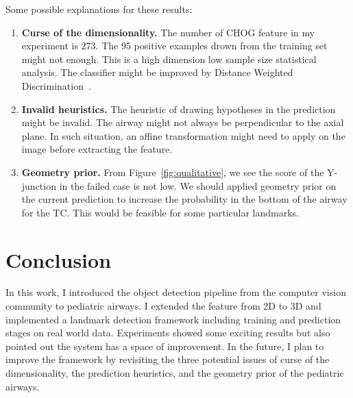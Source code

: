 \documentclass{article}
\begin{document}
Some possible explanations for these results:
\begin{enumerate}
\item {\bf Curse of the dimensionality.}
The number of CHOG feature in my experiment is 273.
The 95 positive examples drown from the training set might not enough.
This is a high dimension low sample size statistical analysis.
The classifier might be improved by Distance Weighted Discrimination~\cite{marron2007distance}.
\item {\bf Invalid heuristics.}
The heuristic of drawing hypotheses in the prediction might be invalid.
The airway might not always be perpendicular to the axial plane.
In such situation, an affine transformation might need to apply on the image before extracting the feature.
\item {\bf Geometry prior.}
From Figure~\ref{fig:qualitative}, we see the score of the Y-junction in the failed case is not low.
We should applied geometry prior on the current prediction to increase the probability in the bottom of the airway for the TC.
This would be feasible for some particular landmarks.

\end{enumerate}

\section{Conclusion}
In this work, I introduced the object detection pipeline from the computer vision community to pediatric airways.
I extended the feature from 2D to 3D and implemented a landmark detection framework including training and prediction stages on real world data.
Experiments showed some exciting results but also pointed out the system has a space of improvement.
In the future, I plan to improve the framework by revisiting the three potential issues of curse of the dimensionality, the prediction heuristics, and the geometry prior of the pediatric airways.



\end{document}
